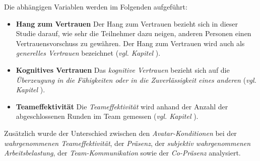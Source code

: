 \documentclass[a4paper,11pt]{article}%
\renewcommand{\\}{\vspace*{0.5\baselineskip} \newline}
\begin{document}
{Die abhängigen Variablen werden im Folgenden aufgeführt:
\begin{itemize}
\item \textbf{Hang zum Vertrauen} Der Hang zum Vertrauen bezieht sich in dieser Studie darauf, wie sehr die Teilnehmer dazu neigen, anderen Personen einen Vertrauensvorschuss zu gewähren. Der Hang zum Vertrauen wird auch als \textit{generelles Vertrauen} bezeichnet \citep[S. 30]{mcallister1995affect} (\textit{vgl. Kapitel }).
\item \textbf{Kognitives Vertrauen} Das \textit{kognitive Vertrauen} bezieht sich auf die \textit{Überzeugung in die Fähigkeiten oder in die Zuverlässigkeit eines anderen} \citep[S. 30]{mcallister1995affect} (\textit{vgl. Kapitel }).
\item \textbf{Teameffektivität} Die \textit{Teameffektivität} wird anhand der Anzahl der abgeschlossenen Runden im Team gemessen (\textit{vgl. Kapitel }).
\end{itemize}

Zusätzlich wurde der Unterschied zwischen den \textit{Avatar-Konditionen} bei der \textit{wahrgenommenen Teameffektivität}, der \textit{Präsenz}, der \textit{subjektiv wahrgenommenen Arbeitsbelastung}, der \textit{Team-Kommunikation} sowie der \textit{Co-Präsenz} analysiert.
				

}
\end{document}
